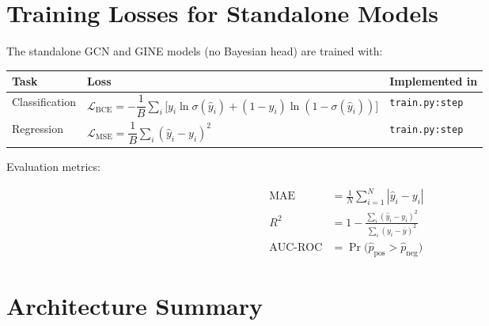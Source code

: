 \documentclass[11pt,a4paper]{article}
\newcommand{\code}[1]{\texttt{#1}}
\begin{document}
\section{Training Losses for Standalone Models}
\label{sec:losses}

The standalone GCN and GINE models (no Bayesian head) are trained with:

\begin{center}
\renewcommand{\arraystretch}{1.5}
\begin{tabular}{lll}
\toprule
\textbf{Task} & \textbf{Loss} & \textbf{Implemented in} \\
\midrule
Classification &
  $\mathcal{L}_{\mathrm{BCE}} = -\dfrac{1}{B}\displaystyle\sum_{i}
    \bigl[y_i\ln\sigma(\hat{y}_i) + (1-y_i)\ln(1-\sigma(\hat{y}_i))\bigr]$
  & \code{train.py:step} \\[10pt]
Regression &
  $\mathcal{L}_{\mathrm{MSE}} = \dfrac{1}{B}\displaystyle\sum_{i}(\hat{y}_i - y_i)^2$
  & \code{train.py:step} \\
\bottomrule
\end{tabular}
\end{center}

\medskip
Evaluation metrics:

\begin{align}
\mathrm{MAE} &= \frac{1}{N}\sum_{i=1}^N |\hat{y}_i - y_i| \\[4pt]
R^2 &= 1 - \frac{\sum_i (\hat{y}_i - y_i)^2}{\sum_i (y_i - \bar{y})^2} \\[4pt]
\mathrm{AUC\text{-}ROC} &= \Pr\!\bigl(\hat{p}_{\mathrm{pos}} > \hat{p}_{\mathrm{neg}}\bigr)
\end{align}

\section{Architecture Summary}
\label{sec:summary}
\end{document}
